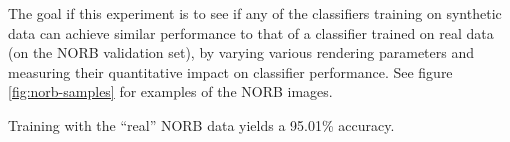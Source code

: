 \documentclass[10pt,twocolumn,letterpaper]{article}
\newcommand{\tompson}[1]{{\color{green} JT: #1}}
\begin{document}
The goal if this experiment is to see if any of the classifiers training on synthetic data can achieve similar performance to that of a classifier trained on real data (on the NORB validation set), by varying various rendering parameters and measuring their quantitative impact on classifier performance.  See figure \ref{fig:norb-samples} for examples of the NORB images.

Training with the ``real'' NORB data yields a 95.01\% accuracy.  %

\end{document}
